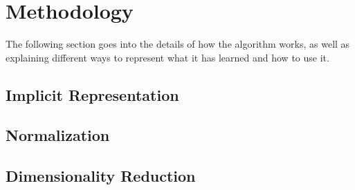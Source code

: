 \section{Methodology} \label{sect:meth}
The following section goes into the details of how the \mlblink algorithm works, as well as explaining different ways to represent what it has learned and how to use it. 




\subsection{Implicit Representation} \label{subsect:meth:implicit}

\subsection{Normalization} \label{subsect:meth:norm}

\subsection{Dimensionality Reduction} \label{subsect:meth:dim-reduction}

